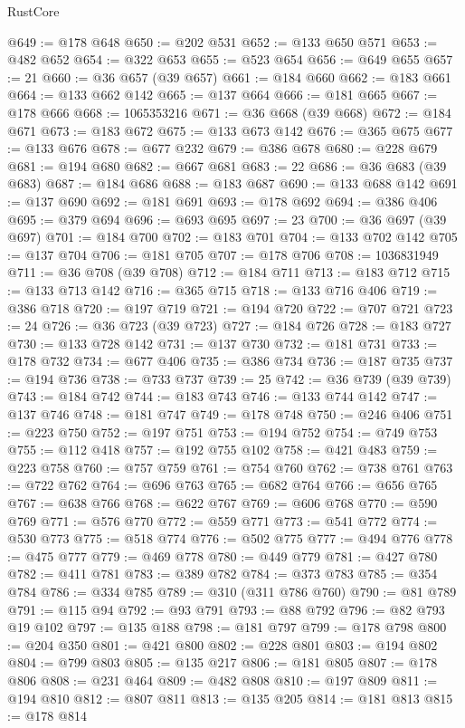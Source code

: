 \begin{lexlean}{RustCore}
\begin{coremodule}
@649 := @178 @648
@650 := @202 @531
@652 := @133 @650 @571
@653 := @482 @652
@654 := @322 @653
@655 := @523 @654
@656 := @649 @655
@657 := 21
@660 := @36 @657 (@39 @657)
@661 := @184 @660
@662 := @183 @661
@664 := @133 @662 @142
@665 := @137 @664
@666 := @181 @665
@667 := @178 @666
@668 := 1065353216
@671 := @36 @668 (@39 @668)
@672 := @184 @671
@673 := @183 @672
@675 := @133 @673 @142
@676 := @365 @675
@677 := @133 @676
@678 := @677 @232
@679 := @386 @678
@680 := @228 @679
@681 := @194 @680
@682 := @667 @681
@683 := 22
@686 := @36 @683 (@39 @683)
@687 := @184 @686
@688 := @183 @687
@690 := @133 @688 @142
@691 := @137 @690
@692 := @181 @691
@693 := @178 @692
@694 := @386 @406
@695 := @379 @694
@696 := @693 @695
@697 := 23
@700 := @36 @697 (@39 @697)
@701 := @184 @700
@702 := @183 @701
@704 := @133 @702 @142
@705 := @137 @704
@706 := @181 @705
@707 := @178 @706
@708 := 1036831949
@711 := @36 @708 (@39 @708)
@712 := @184 @711
@713 := @183 @712
@715 := @133 @713 @142
@716 := @365 @715
@718 := @133 @716 @406
@719 := @386 @718
@720 := @197 @719
@721 := @194 @720
@722 := @707 @721
@723 := 24
@726 := @36 @723 (@39 @723)
@727 := @184 @726
@728 := @183 @727
@730 := @133 @728 @142
@731 := @137 @730
@732 := @181 @731
@733 := @178 @732
@734 := @677 @406
@735 := @386 @734
@736 := @187 @735
@737 := @194 @736
@738 := @733 @737
@739 := 25
@742 := @36 @739 (@39 @739)
@743 := @184 @742
@744 := @183 @743
@746 := @133 @744 @142
@747 := @137 @746
@748 := @181 @747
@749 := @178 @748
@750 := @246 @406
@751 := @223 @750
@752 := @197 @751
@753 := @194 @752
@754 := @749 @753
@755 := @112 @418
@757 := @192 @755 @102
@758 := @421 @483
@759 := @223 @758
@760 := @757 @759
@761 := @754 @760
@762 := @738 @761
@763 := @722 @762
@764 := @696 @763
@765 := @682 @764
@766 := @656 @765
@767 := @638 @766
@768 := @622 @767
@769 := @606 @768
@770 := @590 @769
@771 := @576 @770
@772 := @559 @771
@773 := @541 @772
@774 := @530 @773
@775 := @518 @774
@776 := @502 @775
@777 := @494 @776
@778 := @475 @777
@779 := @469 @778
@780 := @449 @779
@781 := @427 @780
@782 := @411 @781
@783 := @389 @782
@784 := @373 @783
@785 := @354 @784
@786 := @334 @785
@789 := @310 (@311 @786 @760)
@790 := @81 @789
@791 := @115 @94
@792 := @93 @791
@793 := @88 @792
@796 := @82 @793 @19 @102
@797 := @135 @188
@798 := @181 @797
@799 := @178 @798
@800 := @204 @350
@801 := @421 @800
@802 := @228 @801
@803 := @194 @802
@804 := @799 @803
@805 := @135 @217
@806 := @181 @805
@807 := @178 @806
@808 := @231 @464
@809 := @482 @808
@810 := @197 @809
@811 := @194 @810
@812 := @807 @811
@813 := @135 @205
@814 := @181 @813
@815 := @178 @814

\end{coremodule}
\end{lexlean}
